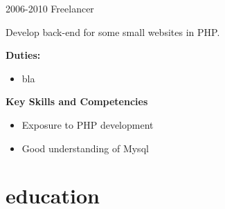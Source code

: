 \documentclass[]{friggeri-cv} %
\begin{document}
\begin{entrylist}

\entry
{2006-2010}
{Freelancer}
{}
{
Develop back-end for some small websites in PHP.

\textbf{Duties:}
\begin{itemize}
\item bla
\end{itemize}

\textbf{Key Skills and Competencies}
\begin{itemize}
\item Exposure to PHP development
\item Good understanding of Mysql
\end{itemize}
}


%
%


\end{entrylist}


\section{education}
\end{document}
